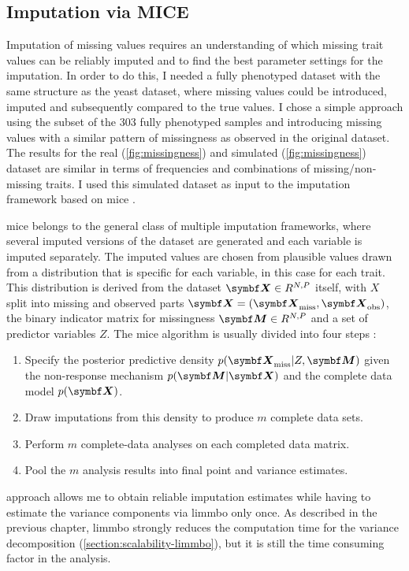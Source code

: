 \subsection{Imputation via MICE} 
Imputation of missing values requires an understanding of which missing trait values can be reliably imputed and to find the best parameter settings for the imputation. In order to do this, I needed a fully phenotyped dataset with the same structure as the yeast dataset, where missing values could be introduced, imputed and subsequently compared to the true values. I chose a simple approach using the subset of the \num{303} fully phenotyped samples and introducing missing values with a similar pattern of missingness as observed in the original dataset. The results for the real (\cref{fig:missingness}) and simulated (\cref{fig:missingness}) dataset are similar in terms of frequencies and combinations of missing/non-missing traits. I used this simulated dataset as input to the imputation framework based on \gls{mice} \citep{vanBuuren2011}. 

\gls{mice} belongs to the general class of multiple imputation frameworks, where several imputed versions of the dataset are generated and each variable is imputed separately. The imputed values are chosen from plausible values drawn from a distribution that is specific for each variable, in this case for each trait. This distribution is derived from the dataset \(\mat{X} \in R^{N,P}\) itself,  with \(X\) split into missing and observed parts \(\mat{X} = (\mat{X}_\text{miss}, \mat{X}_\text{obs})\), the binary indicator matrix for missingness \(\mat{M} \in R^{N,P}\) and a set of predictor variables \(Z\). The \gls{mice} algorithm is usually divided into four steps \citep{Rubin1987,vanBuuren1999,Pigott2001}:
\begin{enumerate}
\item Specify the posterior predictive density \(p(\mat{X}_\text{miss} | Z, \mat{M})\) given the non-response mechanism  \(p(\mat{M} | \mat{X})\)  and the complete data model  \(p(\mat{X})\).
\item Draw imputations from this density to produce \(m\) complete data sets. 
\item Perform \(m\) complete-data analyses on each completed data matrix. 
\item Pool the \(m\) analysis results into final point and variance estimates.
\end{enumerate}
\citet{Garson2015} approach allows me to  obtain reliable imputation estimates while having to estimate the variance components via \gls{limmbo} only once. As described in the previous chapter, \gls{limmbo} strongly reduces the computation time for the variance decomposition (\cref{section:scalability-limmbo}), but it is still the time consuming factor in the analysis. 

